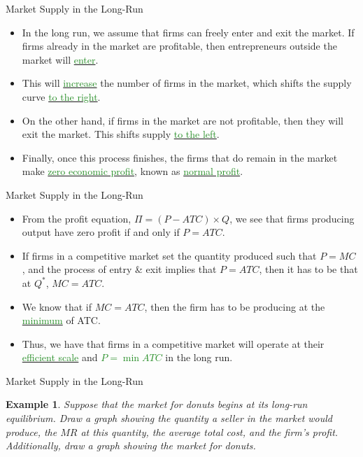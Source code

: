 \documentclass[xcolor={dvipsnames},pdf, hyperref={colorlinks=true, citecolor=ForestGreen, linkcolor=BlueViolet, urlcolor=Magenta}, handout]{beamer}
\newtheorem{exmp}{Example}[section]
\newcommand{\dd}[1]{{\underline{\textcolor{ForestGreen}{#1}}}}
\begin{document}
\begin{frame}{Market Supply in the Long-Run}
\begin{itemize}
	\item 	In the long run, we assume that firms can freely enter and exit the market. If firms already in the market are profitable, then entrepreneurs outside the market will \dd{enter}. 
	\item This will \dd{increase} the number of firms in the market, which shifts the supply curve \dd{to the right}. 
	\item On the other hand, if firms in the market are not profitable, then they will exit the market. This shifts supply \dd{to the left}. 
	\item Finally, once this process finishes, the firms that do remain in the market make \dd{zero economic profit}, known as \dd{normal profit}.

\end{itemize}
\end{frame}

\begin{frame}{Market Supply in the Long-Run}
\begin{itemize}
	\item From the profit equation, $\Pi = (P - ATC) \times Q$, we see that firms producing output have zero profit if and only if $P = ATC$. 
	\item 	If firms in a competitive market set the quantity produced such that $P = MC$, and the process of entry \& exit implies that $P = ATC$, then it has to be that at $Q^*$, $MC = ATC$. 
	\item We know that if $MC = ATC$, then the firm has to be producing at the \dd{minimum} of ATC. 
	\item Thus, we have that firms in a competitive market will operate at their \dd{efficient scale} and \dd{$P = \min ATC$} in the long run.
\end{itemize}
\end{frame}

\begin{frame}{Market Supply in the Long-Run}
	\begin{exmp} Suppose that the market for donuts begins at its long-run equilibrium. Draw a graph showing the quantity a seller in the market would produce, the $MR$ at this quantity, the average total cost, and the firm's profit. Additionally, draw a graph showing the market for donuts. 
\end{exmp}



\end{frame}
\end{document}
